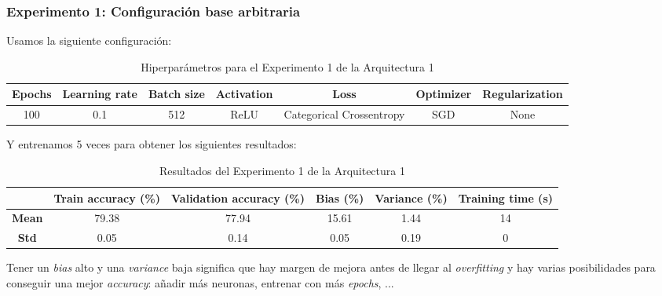 \documentclass{article}
\begin{document}
		\subsubsection{Experimento 1: Configuraci\'on base arbitraria}
		\label{d-s-a1-e1}
			Usamos la siguiente configuraci\'on:
			\begin{table}[!h]
				\begin{center}
					\begin{tabular}{| c | c | c | c | c | c | c |}
						\textbf{Epochs} & \textbf{Learning rate} & \textbf{Batch size} & \textbf{Activation} & \textbf{Loss} & \textbf{Optimizer} & \textbf{Regularization} \\ \hline
						100 & 0.1 & 512 & ReLU & Categorical Crossentropy & SGD & None
					\end{tabular}
					\caption{Hiperpar\'ametros para el Experimento 1 de la Arquitectura 1}
					\label{tab:hip-d-a1-e1}
				\end{center}
			\end{table}
		
			Y entrenamos 5 veces para obtener los siguientes resultados:
			\begin{table}[!h]
				\begin{center}
					\begin{tabular}{ c | c | c | c | c | c |}
						\ & \textbf{Train accuracy (\%)} & \textbf{Validation accuracy (\%)} & \textbf{Bias (\%)} & \textbf{Variance (\%)} & \textbf{Training time (s)} \\ \hline
						\textbf{Mean} & 79.38 & 77.94 & 15.61 & 1.44 & 14\\ \hline
						\textbf{Std} & 0.05 & 0.14 & 0.05 & 0.19 & 0 \\ \hline
					\end{tabular}
					\caption{Resultados del Experimento 1 de la Arquitectura 1}
					\label{tab:res-d-a1-e1}
				\end{center}
			\end{table}
		
			Tener un \textit{bias} alto y una \textit{variance} baja significa que hay margen de mejora antes de llegar al \textit{overfitting} y hay varias posibilidades para conseguir una mejor \textit{accuracy}: a\~nadir m\'as neuronas, entrenar con m\'as \textit{epochs}, ...
		
\end{document}
